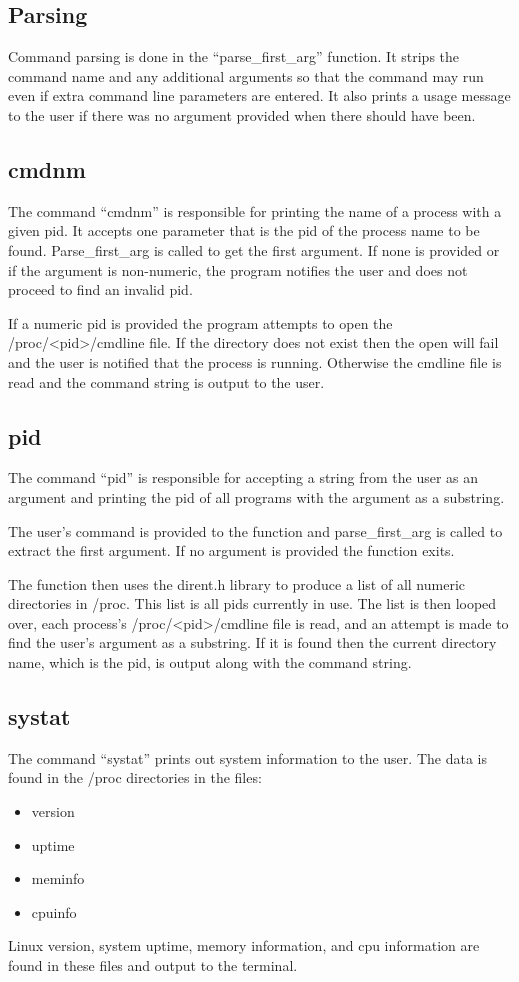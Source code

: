 \documentclass[11pt]{article}
\begin{document}
\begin{multicols}{2}
\subsection{Parsing}
Command parsing is done in the ``parse\_first\_arg'' function. It strips the command name and any additional arguments so that the command may run even if extra command line parameters are entered. It also prints a usage message to the user if there was no argument provided when there should have been.

\subsection{cmdnm}
The command ``cmdnm'' is responsible for printing the name of a process with a given pid. It accepts one parameter that is the pid of the process name to be found. Parse\_first\_arg is called to get the first argument. If none is provided or if the argument is non-numeric, the program notifies the user and does not proceed to find an invalid pid.

If a numeric pid is provided the program attempts to open the /proc/<pid>/cmdline file. If the directory does not exist then the open will fail and the user is notified that the process is running. Otherwise the cmdline file is read and the command string is output to the user.

\subsection{pid}
The command ``pid'' is responsible for accepting a string from the user as an argument and printing the pid of all programs with the argument as a substring. 

The user's command is provided to the function and parse\_first\_arg is called to extract the first argument. If no argument is provided the function exits.

The function then uses the dirent.h library to produce a list of all numeric directories in /proc. This list is all pids currently in use. The list is then looped over, each process's /proc/<pid>/cmdline file is read, and an attempt is made to find the user's argument as a substring. If it is found then the current directory name, which is the pid, is output along with the command string.

\subsection{systat}
The command ``systat'' prints out system information to the user. The data is found in the /proc directories in the files:
\begin{itemize}
\item version
\item uptime
\item meminfo
\item cpuinfo
\end{itemize}
Linux version, system uptime, memory information, and cpu information are found in these files and output to the terminal.


\end{multicols}
\end{document}
